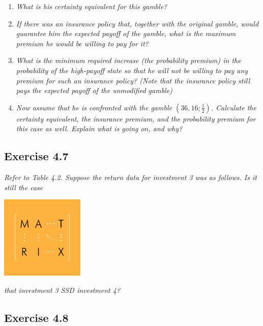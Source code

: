 \documentclass[]{book}
\theoremstyle{definition}
\theoremstyle{definition}
\theoremstyle{remark}
\begin{document}
\begin{enumerate}
\def\labelenumi{\alph{enumi}.}
\item
  \emph{What is his certainty equivalent for this gamble?}
  \citep[p.8]{exercises_danthine}
\item
  \emph{If there was an insurance policy that, together with the
  original gamble, would guarantee him the expected payoff of the
  gamble, what is the maximum premium he would be willing to pay for
  it?} \citep[p.8]{exercises_danthine}
\item
  \emph{What is the minimum required increase (the probability premium)
  in the probability of the high-payoff state so that he will not be
  willing to pay any premium for such an insurance policy? (Note that
  the insurance policy still pays the expected payoff of the unmodified
  gamble)} \citep[p.8]{exercises_danthine}
\item
  \emph{Now assume that he is confronted with the gamble
  \(\left(36,16;\frac{1}{2}\right)\). Calculate the certainty
  equivalent, the insurance premium, and the probability premium for
  this case as well. Explain what is going on, and why?}
  \citep[p.8]{exercises_danthine}
\end{enumerate}

\subsection{Exercise 4.7}\label{exercise-4.7}

\emph{Refer to Table 4.2. Suppose the return data for investment 3 was
as follows. Is it still the case} \citep[p.9]{exercises_danthine}

\begin{center}\includegraphics[width=150px]{figures/matrix} \end{center}

\emph{that investment 3 SSD investment 4?}
\citep[p.9]{exercises_danthine}

\subsection{Exercise 4.8}\label{exercise-4.8}
\end{document}
